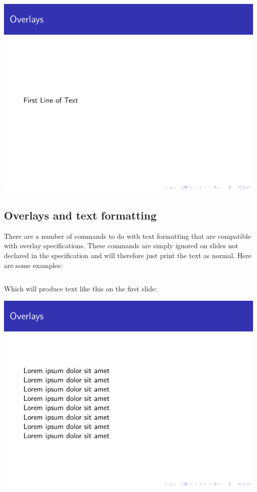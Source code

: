 \begin{column}{0.5\textwidth}
\includegraphics[page=3]{examples/beamer/beameroverlay06.pdf}

\subsection{Overlays and text formatting}

There are a number of commands to do with text formatting that are compatible with overlay specifications. These commands are simply ignored on slides not declared in the specification and will therefore just print the text as normal. Here are some examples:

\inputminted[linenos=true]{latex}{examples/beamer/beameroverlay07.tex}

Which will produce text like this on the first slide:

\includegraphics[page=1]{examples/beamer/beameroverlay07.pdf}


\end{column}
